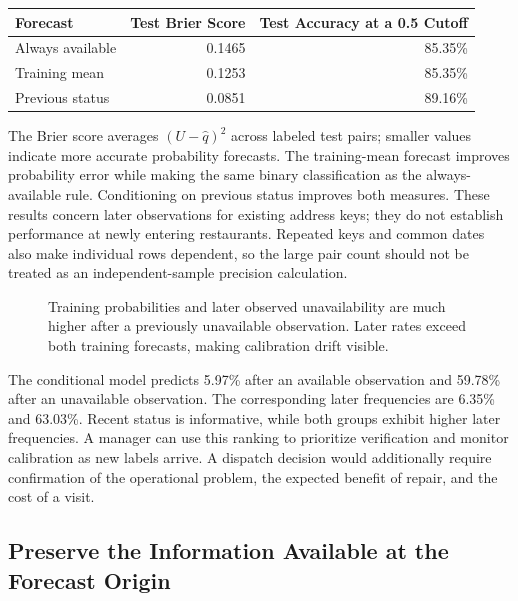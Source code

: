 \begin{table}[H]
\centering\small
\begin{tabular}{@{}lrr@{}}
\toprule
Forecast & Test Brier Score & Test Accuracy at a 0.5 Cutoff \\
\midrule

Always available & 0.1465 & 85.35\% \\
Training mean & 0.1253 & 85.35\% \\
Previous status & 0.0851 & 89.16\% \\
\bottomrule
\end{tabular}
\end{table}

The Brier score averages \((U-\widehat q)^2\) across labeled test pairs;
smaller values indicate more accurate probability forecasts. The
training-mean forecast improves probability error while making the same
binary classification as the always-available rule. Conditioning on
previous status improves both measures. These results concern later
observations for existing address keys; they do not establish
performance at newly entering restaurants. Repeated keys and common
dates also make individual rows dependent, so the large pair count
should not be treated as an independent-sample precision calculation.

\begin{figure}[htbp]
\centering

\caption{Training probabilities and later observed unavailability are much higher after a previously unavailable observation. Later rates exceed both training forecasts, making calibration drift visible.}\label{fig:M07_mcbroken_prediction}
\end{figure}

The conditional model predicts 5.97\% after an available observation and
59.78\% after an unavailable observation. The corresponding later
frequencies are 6.35\% and 63.03\%. Recent status is informative, while
both groups exhibit higher later frequencies. A manager can use this
ranking to prioritize verification and monitor calibration as new labels
arrive. A dispatch decision would additionally require confirmation of
the operational problem, the expected benefit of repair, and the cost of
a visit.

\hypertarget{M07-preserve-the-information-available-at-the-forecast-origin}{%
\subsection{Preserve the Information Available at the Forecast
Origin}\label{M07-preserve-the-information-available-at-the-forecast-origin}}

